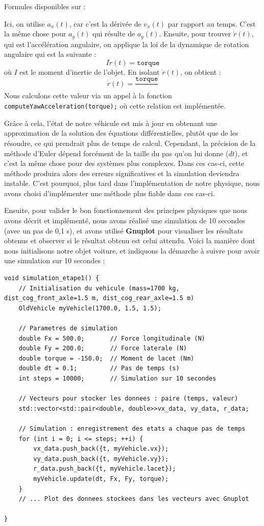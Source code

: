 \begin{center}
    Formules disponibles sur : \cite{euler_explicite}
\end{center}

Ici, on utilise $a_x(t)$, car c'est la dérivée de $v_x(t)$ par rapport au temps. C'est la même chose pour $a_y(t)$ qui résulte de $a_y(t)$. Ensuite, pour trouver $\dot{r}(t)$, qui est l'accélération angulaire, on applique la loi de la dynamique de rotation angulaire qui est la suivante :
$$I\dot{r}(t) = \texttt{torque}$$
où $I$ est le moment d'inertie de l'objet. En isolant $\dot{r}(t)$, on obtient :
$$\dot{r}(t)= {\frac{\texttt{torque}}{}}$$
Nous calculons cette valeur via un appel à la fonction \texttt{computeYawAcceleration(torque);} où cette relation est implémentée.

Grâce à cela, l'état de notre véhicule est mis à jour en obtenant une approximation de la solution des équations différentielles, plutôt que de les résoudre, ce qui prendrait plus de temps de calcul.
Cependant, la précision de la méthode d'Euler dépend forcément de la taille du pas qu'on lui donne ($dt$), et c'est la même chose pour des systèmes plus complexes. Dans ces cas-ci, cette méthode produira alors des erreurs significatives et la simulation deviendra instable. C'est pourquoi, plus tard dans l'implémentation de notre physique, nous avons choisi d'implémenter une méthode plus fiable dans ces cas-ci.

Ensuite, pour valider le bon fonctionnement des principes physiques que nous avons décrit et implémenté, nous avons réalisé une simulation de 10 secondes (avec un pas de 0,1 s), et avons utilisé \textbf{Gnuplot} pour visualiser les résultats obtenus et observer si le résultat obtenu est celui attendu. Voici la manière dont nous initialisons notre objet voiture, et indiquons la démarche à suivre pour avoir une simulation sur 10 secondes :
\begin{lstlisting}[style=CStyle,label={lst:void_simulation_etape1}]
void simulation_etape1() {
    // Initialisation du vehicule (mass=1700 kg, dist_cog_front_axle=1.5 m, dist_cog_rear_axle=1.5 m)
    OldVehicle myVehicle(1700.0, 1.5, 1.5);

    // Parametres de simulation
    double Fx = 500.0;       // Force longitudinale (N)
    double Fy = 200.0;       // Force laterale (N)
    double torque = -150.0;  // Moment de lacet (Nm)
    double dt = 0.1;         // Pas de temps (s)
    int steps = 10000;       // Simulation sur 10 secondes

    // Vecteurs pour stocker les donnees : paire (temps, valeur)
    std::vector<std::pair<double, double>>vx_data, vy_data, r_data;

    // Simulation : enregistrement des etats a chaque pas de temps
    for (int i = 0; i <= steps; ++i) {
        vx_data.push_back({t, myVehicle.vx});
        vy_data.push_back({t, myVehicle.vy});
        r_data.push_back({t, myVehicle.lacet});
        myVehicle.update(dt, Fx, Fy, torque);
    }
    // ... Plot des donnees stockees dans les vecteurs avec Gnuplot

}
\end{lstlisting}

